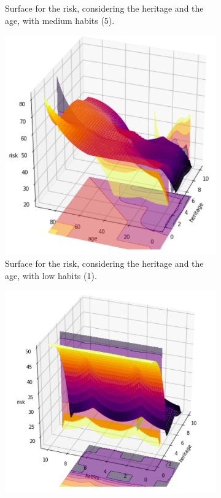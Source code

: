 \begin{figure}[ht]
\begin{subfigure}{.3\textwidth}
  \caption{Surface for the risk, considering the heritage and the age, with medium habits (5).}
  \label{fig:sur2}
\end{subfigure}
\begin{subfigure}{.3\textwidth}
  \centering
  \includegraphics[width=.8\linewidth]{figures/heritage-age1.png}  
  \caption{Surface for the risk, considering the heritage and the age, with low habits (1).}
  \label{fig:sur3}
\end{subfigure}
\begin{subfigure}{.3\textwidth}
  \centering
  \includegraphics[width=.8\linewidth]{figures/heritage-habits1.png}  

\end{subfigure}
\end{figure}
